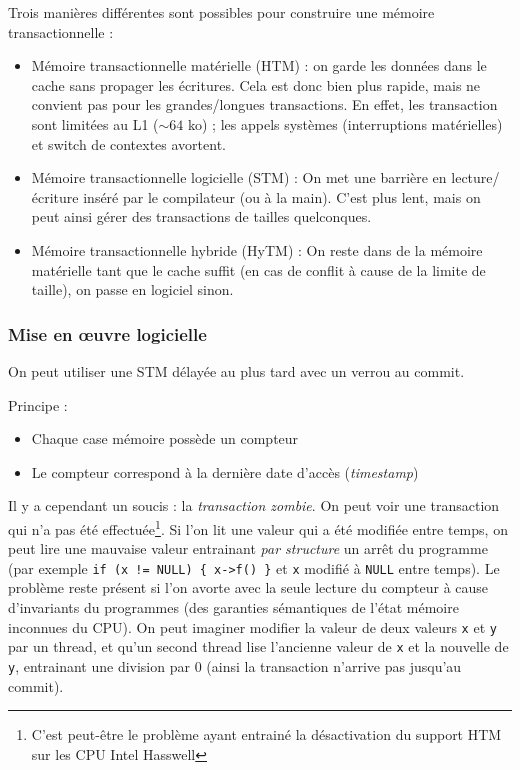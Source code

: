 \documentclass{article}
\begin{document}
Trois manières différentes sont possibles pour construire une mémoire transactionnelle :
\begin{itemize}
\item Mémoire transactionnelle matérielle (HTM) : on garde les données dans le cache sans propager les écritures. Cela est donc bien plus rapide, mais ne convient pas pour les grandes/longues transactions. En effet, les transaction sont limitées au L1 ($\sim 64$ ko) ; les appels systèmes (interruptions matérielles) et switch de contextes avortent.
\item Mémoire transactionnelle logicielle (STM) : On met une barrière en lecture/écriture inséré par le compilateur (ou à la main). C'est plus lent, mais on peut ainsi gérer des transactions de tailles quelconques.
\item Mémoire transactionnelle hybride (HyTM) : On reste dans de la mémoire matérielle tant que le cache suffit (en cas de conflit à cause de la limite de taille), on passe en logiciel sinon.
\end{itemize}

\subsubsection*{Mise en œuvre logicielle}
On peut utiliser une STM délayée au plus tard avec un verrou au commit.

Principe :
\begin{itemize}
\item Chaque case mémoire possède un compteur
\item Le compteur correspond à la dernière date d'accès (\emph{timestamp})
\end{itemize}
Il y a cependant un soucis : la \emph{transaction zombie}. On peut voir une transaction qui n'a pas été effectuée\footnote{C'est peut-être le problème ayant entrainé la désactivation du support HTM sur les CPU Intel Hasswell}. Si l'on lit une valeur qui a été modifiée entre temps, on peut lire une mauvaise valeur entrainant \emph{par structure} un arrêt du programme (par exemple \texttt{if (x != NULL) \{  x->f() \}} et \texttt{x} modifié à \texttt{NULL} entre temps). Le problème reste présent si l'on avorte avec la seule lecture du compteur à cause d'invariants du programmes (des garanties sémantiques de l'état mémoire inconnues du CPU). On peut imaginer modifier la valeur de deux valeurs \texttt{x} et \texttt{y} par un thread, et qu'un second thread lise l'ancienne valeur de \texttt{x} et la nouvelle de \texttt{y}, entrainant une division par 0 (ainsi la transaction n'arrive pas jusqu'au commit).
\end{document}
